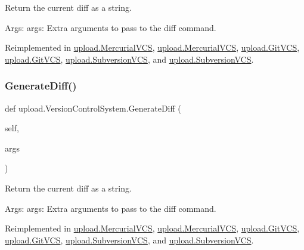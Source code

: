 \begin{DoxyVerb}Return the current diff as a string.

Args:
  args: Extra arguments to pass to the diff command.
\end{DoxyVerb}
 

Reimplemented in \mbox{\hyperlink{classupload_1_1MercurialVCS_a6c05746012d8cd435c94ace1465671ef}{upload.\+Mercurial\+V\+CS}}, \mbox{\hyperlink{classupload_1_1MercurialVCS_a6c05746012d8cd435c94ace1465671ef}{upload.\+Mercurial\+V\+CS}}, \mbox{\hyperlink{classupload_1_1GitVCS_a3ebfc01cebc9b585706ad3f4389a8833}{upload.\+Git\+V\+CS}}, \mbox{\hyperlink{classupload_1_1GitVCS_a3ebfc01cebc9b585706ad3f4389a8833}{upload.\+Git\+V\+CS}}, \mbox{\hyperlink{classupload_1_1SubversionVCS_a07c2d341f2c7df2772dd7f85e89b0212}{upload.\+Subversion\+V\+CS}}, and \mbox{\hyperlink{classupload_1_1SubversionVCS_a07c2d341f2c7df2772dd7f85e89b0212}{upload.\+Subversion\+V\+CS}}.

\mbox{\label{classupload_1_1VersionControlSystem_aa5eb260c96e7016dab36b5fc136c9f49}} 
\subsubsection{\texorpdfstring{GenerateDiff()}{GenerateDiff()}\hspace{0.1cm}{\footnotesize\ttfamily [2/2]}}
{\footnotesize\ttfamily def upload.\+Version\+Control\+System.\+Generate\+Diff (\begin{DoxyParamCaption}\item[{}]{self,  }\item[{}]{args }\end{DoxyParamCaption})}

\begin{DoxyVerb}Return the current diff as a string.

Args:
  args: Extra arguments to pass to the diff command.
\end{DoxyVerb}
 

Reimplemented in \mbox{\hyperlink{classupload_1_1MercurialVCS_a6c05746012d8cd435c94ace1465671ef}{upload.\+Mercurial\+V\+CS}}, \mbox{\hyperlink{classupload_1_1MercurialVCS_a6c05746012d8cd435c94ace1465671ef}{upload.\+Mercurial\+V\+CS}}, \mbox{\hyperlink{classupload_1_1GitVCS_a3ebfc01cebc9b585706ad3f4389a8833}{upload.\+Git\+V\+CS}}, \mbox{\hyperlink{classupload_1_1GitVCS_a3ebfc01cebc9b585706ad3f4389a8833}{upload.\+Git\+V\+CS}}, \mbox{\hyperlink{classupload_1_1SubversionVCS_a07c2d341f2c7df2772dd7f85e89b0212}{upload.\+Subversion\+V\+CS}}, and \mbox{\hyperlink{classupload_1_1SubversionVCS_a07c2d341f2c7df2772dd7f85e89b0212}{upload.\+Subversion\+V\+CS}}.

